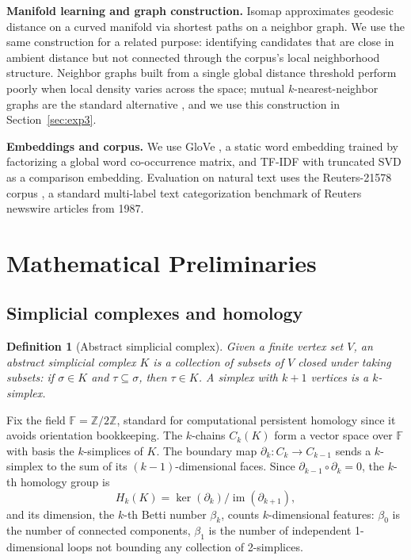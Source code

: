 \documentclass[11pt]{article}
\newtheorem{definition}{Definition}
\begin{document}
\textbf{Manifold learning and graph construction.} Isomap \citep{tenenbaum2000global} approximates geodesic distance on a curved manifold via shortest paths on a neighbor graph. We use the same construction for a related purpose: identifying candidates that are close in ambient distance but not connected through the corpus's local neighborhood structure. Neighbor graphs built from a single global distance threshold perform poorly when local density varies across the space; mutual $k$-nearest-neighbor graphs are the standard alternative \citep{vonluxburg2007tutorial}, and we use this construction in Section~\ref{sec:exp3}.

\textbf{Embeddings and corpus.} We use GloVe \citep{pennington2014glove}, a static word embedding trained by factorizing a global word co-occurrence matrix, and TF-IDF with truncated SVD as a comparison embedding. Evaluation on natural text uses the Reuters-21578 corpus \citep{lewis1997reuters}, a standard multi-label text categorization benchmark of Reuters newswire articles from 1987.

\section{Mathematical Preliminaries}

\subsection{Simplicial complexes and homology}

\begin{definition}[Abstract simplicial complex]
Given a finite vertex set $V$, an abstract simplicial complex $K$ is a collection of subsets of $V$ closed under taking subsets: if $\sigma \in K$ and $\tau \subseteq \sigma$, then $\tau \in K$. A simplex with $k+1$ vertices is a $k$-simplex.
\end{definition}

Fix the field $\mathbb{F} = \mathbb{Z}/2\mathbb{Z}$, standard for computational persistent homology since it avoids orientation bookkeeping. The $k$-chains $C_k(K)$ form a vector space over $\mathbb{F}$ with basis the $k$-simplices of $K$. The boundary map $\partial_k: C_k \to C_{k-1}$ sends a $k$-simplex to the sum of its $(k-1)$-dimensional faces. Since $\partial_{k-1} \circ \partial_k = 0$, the $k$-th homology group is
\[
H_k(K) = \ker(\partial_k) / \operatorname{im}(\partial_{k+1}),
\]
and its dimension, the $k$-th Betti number $\beta_k$, counts $k$-dimensional features: $\beta_0$ is the number of connected components, $\beta_1$ is the number of independent 1-dimensional loops not bounding any collection of 2-simplices.
\end{document}
